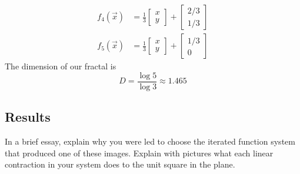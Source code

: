\documentclass[12pt]{article}
\begin{document}
\begin{itemize}
\begin{align*}
		f_4(\vec{x}) &= \frac{1}{3} \begin{bmatrix}
			x \\
			y
		\end{bmatrix} + \begin{bmatrix}
			2/3 \\
			1/3
		\end{bmatrix} \\
		f_5(\vec{x}) &= \frac{1}{3} \begin{bmatrix}
			x \\
			y
		\end{bmatrix} + \begin{bmatrix}
			1/3 \\
			0
		\end{bmatrix}
	\end{align*}
	The dimension of our fractal is
	\[
		D = \frac{\log 5}{\log 3} \approx 1.465
	\]

\end{itemize}
\subsection*{Results}
In a brief essay, explain why you were led to choose the iterated function system that produced one of these images. Explain with pictures what each linear contraction in your system does to the unit square in the plane.
\end{document}
